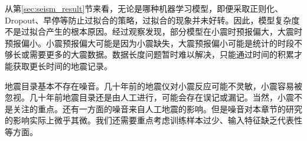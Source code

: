 从第\ref{sec:seism_result}节来看，无论是哪种机器学习模型，即便采取正则化、Dropout、早停等防止过拟合的策略，过拟合的现象并未好转。因此，模型复杂度不是过拟合产生的根本原因。经过观察发现，部分模型在小震时预报偏大，大震时预报偏小。小震预报偏大可能是因为小震缺失，大震预报偏小可能是统计的时段不够长或需要更多的大震数据。数据长度问题暂时难以解决，只能通过时间的积累才能获取更长时间的地震记录。

地震目录基本不存在噪音。几十年前的地震仪对小震反应可能不灵敏，小震容易被忽视。几十年前地震目录还是由人工进行，可能会存在误记或漏记。当然，小震不是关注的重点。还有一方面的噪音来自人工地震的影响。但是噪音对本章节的研究的影响实际上微乎其微。我们还需要重点考虑训练样本过少、输入特征缺乏代表性等方面。



  

